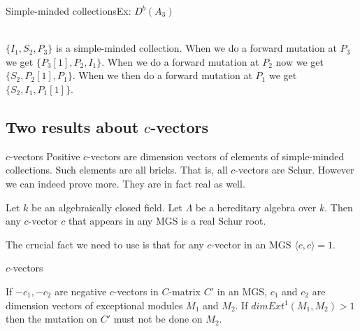 \documentclass{beamer}
\begin{document}
\begin{frame}[fragile]{Simple-minded collections}{Ex: $D^b(A_3)$}
\\\pause
\indent $\{I_1, S_2, P_3\}$ is a simple-minded collection. When we do a forward mutation at $P_3$ we get $\{P_3[1], P_2, I_1\}$. When we do a forward mutation at $P_2$ now we get $\{S_2, P_2[1], P_1\}$. When we then do a forward mutation at $P_1$ we get $\{S_2, I_1, P_1[1]\}$.
\end{frame}

\subsection{Two results about $c$-vectors}

\begin{frame}{$c$-vectors}
\indent Positive $c$-vectors are dimension vectors of elements of simple-minded collections. Such elements are all bricks. That is, all $c$-vectors are Schur. However we can indeed prove more. They are in fact real as well.\\\pause
\begin{lemma}
Let $k$ be an algebraically closed field. Let $\Lambda$ be a hereditary algebra over $k$. Then any $c$-vector $c$ that appears in any MGS is a real Schur root.\pause
\end{lemma}
\indent The crucial fact we need to use is that for any $c$-vector in an MGS $\langle c,c\rangle = 1$.
\end{frame}

\begin{frame}{$c$-vectors}
\begin{lemma}
\indent If $-c_1, -c_2$ are negative $c$-vectors in $C$-matrix $C'$ in an MGS, $c_1$ and $c_2$ are dimension vectors of exceptional modules $M_1$ and $M_2$. If $dim Ext^1(M_1, M_2) > 1$ then the mutation on $C'$ must not be done on $M_2$.
\end{lemma}
\end{frame}
\end{document}
